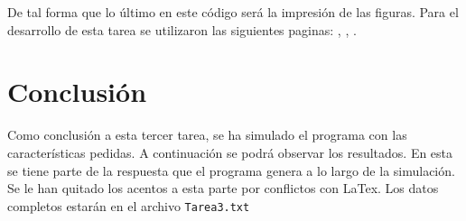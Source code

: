\documentclass{article}
\begin{document}
  De tal forma que lo último en este código será la impresión de las figuras.
  Para el desarrollo de esta tarea se utilizaron las siguientes paginas: \citep{DRA.Medicion}, \citep{DRA.Computo}, \citep{DRA.usobasico}.\\ 

\section{Conclusión}

Como conclusión a esta tercer tarea, se ha simulado el programa con las características pedidas. A continuación se podrá observar los resultados. En esta se tiene parte de la respuesta que el programa genera a lo largo de la simulación. Se le han quitado los acentos a esta parte por conflictos con LaTex. Los datos completos estarán en el archivo \texttt{Tarea3.txt}  \\
\end{document}
